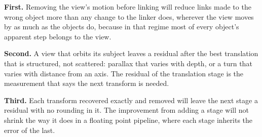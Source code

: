 \textbf{First.} Removing the view's motion before linking will reduce links made to the wrong object
more than any change to the linker does, wherever the view moves by as much as the objects do,
because in that regime most of every object's apparent step belongs to the view.

\textbf{Second.} A view that orbits its subject leaves a residual after the best translation that is
structured, not scattered: parallax that varies with depth, or a turn that varies with distance from
an axis. The residual of the translation stage is the measurement that says the next transform is
needed.

\textbf{Third.} Each transform recovered exactly and removed will leave the next stage a residual with
no rounding in it. The improvement from adding a stage will not shrink the way it does in a floating
point pipeline, where each stage inherits the error of the last.
